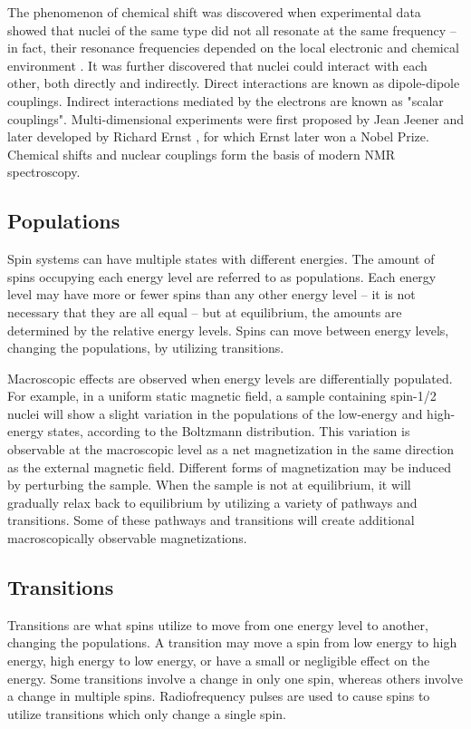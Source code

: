 The phenomenon of chemical shift was discovered when experimental data showed
that nuclei of the same type did not all resonate at the same frequency -- in
fact, their resonance frequencies depended on the local electronic and 
chemical environment \cite{arnold1951variations}.  
It was further discovered that nuclei could interact
with each other, both directly and indirectly.  Direct interactions are 
known as dipole-dipole couplings.  Indirect interactions mediated
by the electrons are known as "scalar couplings".
Multi-dimensional experiments were first proposed by Jean Jeener 
\cite{jeener1979investigation} and later developed by Richard Ernst
\cite{ernst1992nuclear}, for which Ernst later won a Nobel Prize.  
Chemical shifts and nuclear couplings form the basis of modern NMR 
spectroscopy.


\subsection*{Populations}

Spin systems can have multiple states with different energies.  The amount
of spins occupying each energy level are referred to as populations.  Each
energy level may have more or fewer spins than any other energy level -- 
it is not necessary that they are all equal -- but at equilibrium, the amounts
are determined by the relative energy levels.  Spins can move between energy
levels, changing the populations, by utilizing transitions.

Macroscopic effects are observed when energy levels are differentially 
populated.  For example, in a uniform static magnetic field, a sample 
containing spin-1/2 nuclei will show a slight variation in the populations of 
the low-energy and high-energy states, according to the Boltzmann distribution.  
This variation is observable at the macroscopic level as a net magnetization in 
the same direction as the external magnetic field.  Different forms of magnetization
may be induced by perturbing the sample.  When the sample is not at equilibrium,
it will gradually relax back to equilibrium by utilizing a variety of
pathways and transitions.  Some of these pathways and transitions will create
additional macroscopically observable magnetizations.


\subsection*{Transitions}

Transitions are what spins utilize to move from one energy level to another,
changing the populations.
A transition may move a spin from low energy to high energy, high energy to
low energy, or have a small or negligible effect on the energy.
Some transitions involve a change in only one spin, whereas others involve a
change in multiple spins.  Radiofrequency pulses are used to cause spins to
utilize transitions which only change a single spin.

